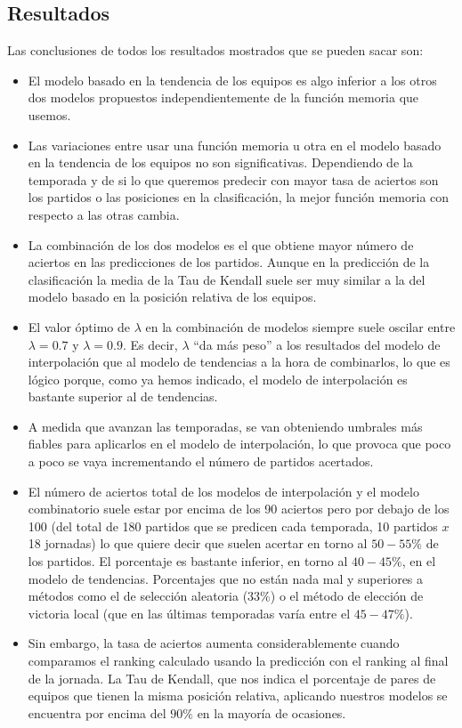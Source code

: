 \newpage
\subsection{Resultados}
Las conclusiones de todos los resultados mostrados que se pueden sacar son:
\begin{itemize}
	\item El modelo basado en la tendencia de los equipos es algo inferior a los otros dos modelos propuestos independientemente de la función memoria que usemos. 
	\item Las variaciones entre usar una función memoria u otra en el modelo basado en la tendencia de los equipos no son significativas. Dependiendo de la temporada y de si lo que queremos predecir con mayor tasa de aciertos son los partidos o las posiciones en la clasificación, la mejor función memoria con respecto a las otras cambia.  
	\item La combinación de los dos modelos es el que obtiene mayor número de aciertos en las predicciones de los partidos. Aunque en la predicción de la clasificación la media de la Tau de Kendall suele ser muy similar a la del modelo basado en la posición relativa de los equipos.
	\item El valor óptimo de $\lambda$ en la combinación de modelos siempre suele oscilar entre $\lambda=0.7$ y $\lambda=0.9$. Es decir, $\lambda$ ``da más peso'' a los resultados del modelo de interpolación que al modelo de tendencias a la hora de combinarlos, lo que es lógico porque, como ya hemos indicado, el modelo de interpolación es bastante superior al de tendencias.
	\item A medida que avanzan las temporadas, se van obteniendo umbrales más fiables para aplicarlos en el modelo de interpolación, lo que provoca que poco a poco se vaya incrementando el número de partidos acertados.
	\item El número de aciertos total de los modelos de interpolación y el modelo combinatorio suele estar por encima de los 90 aciertos pero por debajo de los 100 (del total de 180 partidos que se predicen cada temporada, 10 partidos $x$ 18 jornadas) lo que quiere decir que suelen acertar en torno al $50-55\%$ de los partidos. El porcentaje es bastante inferior, en torno al $40-45\%$, en el modelo de tendencias. Porcentajes que no están nada mal y superiores a métodos como el de selección aleatoria ($33\%$) o el método de elección de victoria local (que en las últimas temporadas varía entre el $45-47\%$).
	\item Sin embargo, la tasa de aciertos aumenta considerablemente cuando comparamos el ranking calculado usando la predicción con el ranking al final de la jornada. La Tau de Kendall, que nos indica el porcentaje de pares de equipos que tienen la misma posición relativa, aplicando nuestros modelos se encuentra por encima del $90\%$ en la mayoría de ocasiones.
\end{itemize}